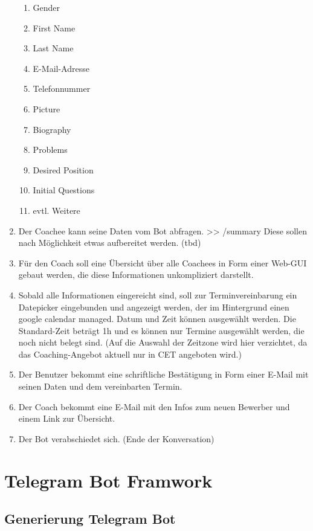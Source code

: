 \begin{enumerate}
\begin{enumerate}
            \item Gender
            \item First Name
            \item Last Name
            \item E-Mail-Adresse
            \item Telefonnummer
            \item Picture
            \item Biography
            \item Problems
            \item Desired Position
            \item Initial Questions
            \item evtl. Weitere
        \end{enumerate} 
        \item Der Coachee kann seine Daten vom Bot abfragen. >> /summary Diese sollen nach Möglichkeit etwas aufbereitet werden. (tbd)
        \item Für den Coach soll eine Übersicht über alle Coachees in Form einer Web-GUI gebaut werden, die diese Informationen unkompliziert darstellt.
        \item Sobald alle Informationen eingereicht sind, soll zur Terminvereinbarung ein Datepicker eingebunden und angezeigt werden, der im Hintergrund einen google calendar managed. Datum und Zeit können ausgewählt werden. Die Standard-Zeit beträgt 1h und es können nur Termine ausgewählt werden, die noch nicht belegt sind. (Auf die Auswahl der Zeitzone wird hier verzichtet, da das Coaching-Angebot aktuell nur in CET angeboten wird.)
        \item Der Benutzer bekommt eine schriftliche Bestätigung in Form einer E-Mail mit seinen Daten und dem vereinbarten Termin.
        \item Der Coach bekommt eine E-Mail mit den Infos zum neuen Bewerber und einem Link zur Übersicht.
        \item Der Bot verabschiedet sich. (Ende der Konversation)

    \end{enumerate}



    \section{Telegram Bot Framwork}

        \subsection{Generierung Telegram Bot} \label{botfather}

